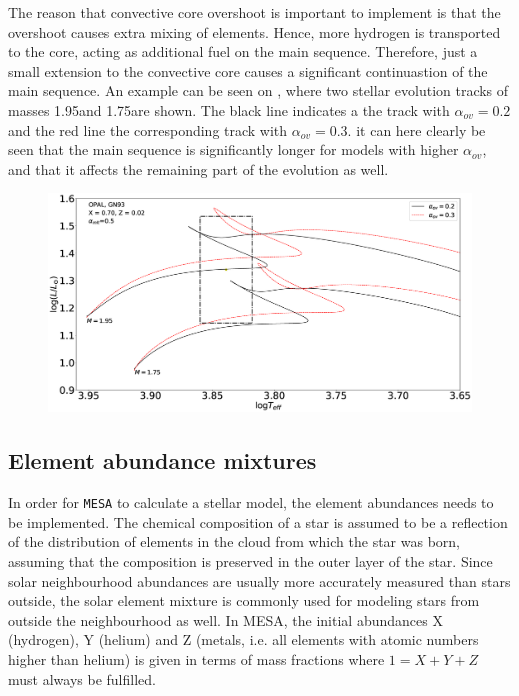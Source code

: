 The reason that convective core overshoot is important to implement is that the overshoot causes extra mixing of elements. Hence, more hydrogen is transported to the core, acting as additional fuel on the main sequence. Therefore, just a small extension to the convective core causes a significant continuastion of the main sequence. An example can be seen on , where two stellar evolution tracks of masses 1.95\msun and 1.75\msun are shown. The black line indicates a the track with $\alpha_{ov}=0.2$ and the red line the corresponding track with $\alpha_{ov}=0.3$. it can here clearly be seen that the main sequence is significantly longer for models with higher $\alpha_{ov}$, and that it affects the remaining part of the evolution as well. 

\begin{figure}[htbp]
    \centering
    \includegraphics[width=1\textwidth]{overshoots_example.eps}
    \caption{}
    \label{ov_example}
\end{figure}
\subsection{Element abundance mixtures}

In order for \texttt{MESA} to calculate a stellar model, the element abundances needs to be implemented. The chemical composition of a star is assumed to be a reflection of the distribution of elements in the cloud from which the star was born, assuming that the composition is preserved in the outer layer of the star. %
Since solar neighbourhood abundances are usually more accurately measured than stars outside, the solar element mixture is commonly used for modeling stars from outside the neighbourhood as well. In MESA, the initial abundances X (hydrogen), Y (helium) and Z (metals, i.e. all elements with atomic numbers higher than helium) is given in terms of mass fractions where $1=X+Y+Z$ must always be fulfilled. 


